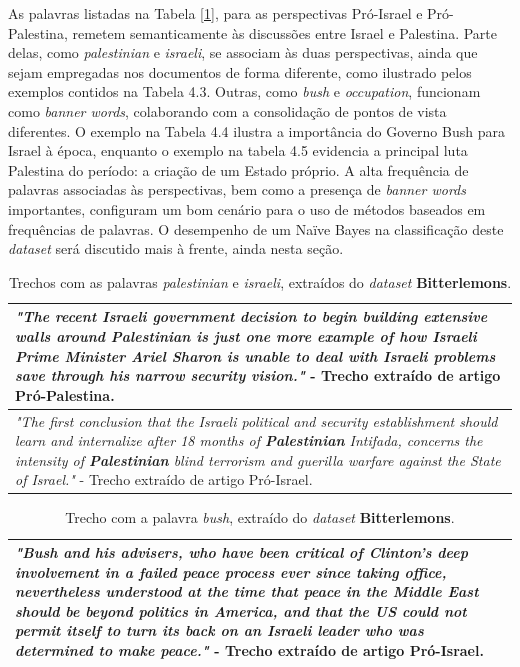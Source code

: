 As palavras listadas na Tabela \ref{1}, para as perspectivas Pró-Israel e Pró-Palestina, remetem semanticamente às discussões entre Israel e Palestina. Parte delas, como \emph{palestinian} e \emph{israeli}, se associam às duas perspectivas, ainda que sejam empregadas nos documentos de forma diferente, como ilustrado pelos exemplos contidos na Tabela 4.3. Outras, como \emph{bush} e \emph{occupation}, funcionam como \emph{banner words}, colaborando com a consolidação de pontos de vista diferentes. O exemplo na Tabela 4.4 ilustra a importância do Governo Bush para Israel à época, enquanto o exemplo na tabela 4.5 evidencia a principal luta Palestina do período: a criação de um Estado próprio. A alta frequência de palavras associadas às perspectivas, bem como a presença de \emph{banner words} importantes, configuram um bom cenário para o uso de métodos baseados em frequências de palavras. O desempenho de um Naïve Bayes na classificação deste \emph{dataset} será discutido mais à frente, ainda nesta seção.

\begin{table}[t]
\centering
\begin{tabular}{| p{10cm} | }
\hline

\emph{"The recent \textbf{Israeli} government decision to begin building extensive walls
around \textbf{Palestinian} is just one more example of how \textbf{Israeli} Prime
Minister Ariel Sharon is unable to deal with \textbf{Israeli} problems save
through his narrow security vision."} - Trecho extraído de artigo Pró-Palestina. \\ \hline

\emph{"The first conclusion that the Israeli political and security
establishment should learn and internalize after 18 months of
\textbf{Palestinian} Intifada, concerns the intensity of \textbf{Palestinian} blind
terrorism and guerilla warfare against the State of Israel."} - Trecho extraído de artigo Pró-Israel. \\ \hline

\end{tabular}
\label{3}
\caption{Trechos com as palavras \emph{palestinian} e \emph{israeli}, extraídos do \emph{dataset} \textbf{Bitterlemons}.}
\end{table}

\begin{table}[t]
\centering
\begin{tabular}{| p{10cm} | }
\hline

\emph{"\textbf{Bush}
and his advisers, who have been critical of Clinton's deep involvement
in a failed peace process ever since taking office, nevertheless
understood at the time that peace in the Middle East should be beyond
politics in America, and that the US could not permit itself to turn its
back on an Israeli leader who was determined to make peace."} - Trecho extraído de artigo Pró-Israel. \\ \hline

\end{tabular}
\label{4}
\caption{Trecho com a palavra \emph{bush}, extraído do \emph{dataset} \textbf{Bitterlemons}.}
\end{table}

